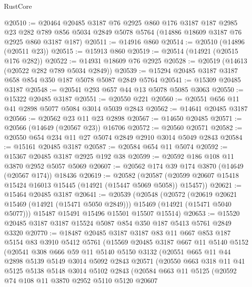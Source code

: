 \begin{lexlean}{RustCore}
\begin{coremodule}
@20510 := @20464
    @20485
    @3187
    @76
    @2925
    @860
    @176
    @3187
    @187
    @2985
    @23
    @282
    @789
    @856
    @5034
    @2849
    @5078
    @5764
    (@14886 @18609 @3187 @76 @2925 @860 @3187 @187)
@20511 := @14916 @860
@20514 := @20510 (@14896 (@20511 @23))
@20515 := @15913 @860
@20519 := @20514 (@14921 (@20515 @176 @282))
@20522 := @14931 @18609 @76 @2925
@20528 := @20519 (@14613 (@20522 @282 @789 @5034 @2849))
@20539 := @15294 @20485 @3187 @3187 @658 @854 @350 @187 @5078 @5087 @2849 @5764
@20541 := @15309 @20485 @3187
@20548 := @20541 @293 @657 @44 @13 @5078 @5085 @3063
@20550 := @15322 @20485 @3187
@20551 := @20550 @221
@20560 := @20551 @656 @11 @41 @2898 @5077 @5084 @3014 @5039 @2843
@20562 := @14641 @20485 @3187
@20566 := @20562 @23 @11 @23 @2898
@20567 := @14650 @20485
@20571 := @20566 (@14649 (@20567 @23)) @16706
@20572 := @20560 @20571
@20582 := @20550 @654 @234 @11 @27 @5074 @2849 @2910 @3014 @5049 @2843
@20584 := @15161 @20485 @3187
@20587 := @20584 @654 @11 @5074
@20592 := @15367 @20485 @3187 @2925 @192 @38
@20599 := @20592 @186 @108 @11 @3870 @2952 @5057 @5069
@20607 := @20562 @174 @39 @174 @3870 (@14649 (@20567 @174)) @18436
@20619 := @20582
    (@20587 (@20599 @20607 @15418 @15424 @16013 @15445 (@14921 (@15447 @5069 @5058)) @15457))
@20621 := @15464 @20485 @3187
@20641 := @20539
    (@20548
      (@20572
        (@20619 @20621 @15469 (@14921 (@15471 @5050 @2849)))
        @15469
        (@14921 (@15471 @5040 @5077)))
      @15487
      @15491
      @15496
      @15501
      @15507
      @15514)
@20653 := @15520 @20485 @3187 @3187 @15524 @5087 @854 @350 @187 @5413 @5761 @2849 @3320
@20770 := @18487
    @20485
    @3187
    @3187
    @83
    @11
    @667
    @853
    @187
    @5154
    @83
    @3910
    @5412
    @5761
    (@15569
      @20485
      @3187
      @667
      @11
      @5140
      @5152
      (@20541
        @308
        @666
        @59
        @11
        @5140
        @5150
        @3132
        (@20551
          @665
          @11
          @44
          @2898
          @5139
          @5149
          @3014
          @5092
          @2843
          @20571
          (@20550
            @663
            @318
            @11
            @41
            @5125
            @5138
            @5148
            @3014
            @5102
            @2843
            (@20584
              @663
              @11
              @5125
              (@20592
                @74
                @108
                @11
                @3870
                @2952
                @5110
                @5120
                @20607

\end{coremodule}
\end{lexlean}
